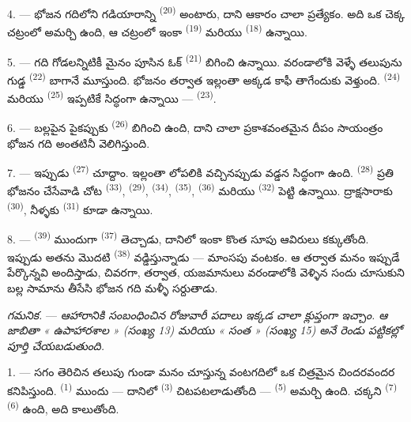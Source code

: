 4. --- భోజన గదిలోని గడియారాన్ని  \textsuperscript{(20)} అంటారు, దాని ఆకారం
చాలా ప్రత్యేకం. అది ఒక చెక్క చట్రంలో అమర్చి ఉంది, ఆ చట్రంలో ఇంకా 
\textsuperscript{(19)} మరియు  \textsuperscript{(18)} ఉన్నాయి.

\VUsaut{4.6mm}
\VUsaut{3.0mm}

5. --- గది గోడలన్నిటికీ మైనం పూసిన ఓక్  \textsuperscript{(21)} బిగించి
ఉన్నాయి. వరండాలోకి వెళ్ళే తలుపును గుడ్డ  \textsuperscript{(22)} బాగానే
మూస్తుంది. భోజనం తర్వాత ఇల్లంతా అక్కడ కాఫీ తాగేందుకు వెళ్తుంది. 
\textsuperscript{(24)} మరియు  \textsuperscript{(25)} ఇప్పటికే సిద్ధంగా ఉన్నాయి
—  \textsuperscript{(23)}.

6. --- బల్లపైన పైకప్పుకు  \textsuperscript{(26)} బిగించి ఉంది, దాని చాలా
ప్రకాశవంతమైన దీపం సాయంత్రం భోజన గది అంతటినీ వెలిగిస్తుంది.

7. --- ఇప్పుడు  \textsuperscript{(27)} చూద్దాం. ఇల్లంతా లోపలికి
వచ్చినప్పుడు వడ్డన సిద్ధంగా ఉంది.  \textsuperscript{(28)} ప్రతి భోజనం
చేసేవాడి చోట  \textsuperscript{(33)}, 
\textsuperscript{(29)},  \textsuperscript{(34)}, 
\textsuperscript{(35)},  \textsuperscript{(36)} మరియు 
\textsuperscript{(32)} పెట్టి ఉన్నాయి. ద్రాక్షసారాకు  \textsuperscript{(30)},
నీళ్ళకు  \textsuperscript{(31)} కూడా ఉన్నాయి.

8. ---  \textsuperscript{(39)} ముందుగా 
\textsuperscript{(37)} తెచ్చాడు, దానిలో ఇంకా కొంత సూపు ఆవిరులు కక్కుతోంది. ఇప్పుడు అతను మొదటి
 \textsuperscript{(38)} వడ్డిస్తున్నాడు — మాంసపు వంటకం. ఆ తర్వాత మనం ఇప్పుడే
పేర్కొన్నవి అందిస్తాడు, చివరగా,  తర్వాత, యజమానులు వరండాలోకి వెళ్ళిన సందు
చూసుకుని బల్ల సామాను తీసేసి భోజన గది మళ్ళీ సర్దుతాడు.

\textit{గమనిక.} ---
\textit{ఆహారానికి సంబంధించిన రోజువారీ పదాలు ఇక్కడ చాలా క్లుప్తంగా ఇచ్చాం. ఆ జాబితా « ఉపాహారశాల » (సంఖ్య 13) మరియు « సంత » (సంఖ్య 15) అనే రెండు పట్టికల్లో పూర్తి చేయబడుతుంది.}

\VUsaut{4.6mm}
\VUsaut{3.0mm}

1. --- సగం తెరిచిన తలుపు గుండా మనం చూస్తున్న వంటగదిలో ఒక చిత్రమైన చిందరవందర కనిపిస్తుంది.
 \textsuperscript{(1)} ముందు — దానిలో  \textsuperscript{(3)}
చిటపటలాడుతోంది —  \textsuperscript{(5)} అమర్చి ఉంది. చక్కని
 \textsuperscript{(7)}  \textsuperscript{(6)}
ఉంది, అది కాలుతోంది.

